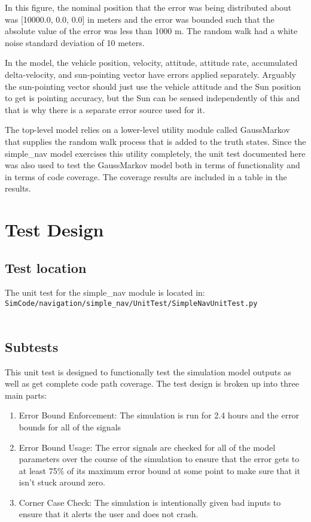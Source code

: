 \documentclass[]{BasiliskReportMemo}
\begin{document}



In this figure, the nominal position that the error was being distributed about
 was [10000.0, 0.0, 0.0] in meters and the error was bounded such that the 
absolute value of the error was less than 1000 m.  The random walk had a white 
noise standard deviation of 10 meters.

In the model, the vehicle position, velocity, attitude, attitude rate, 
accumulated delta-velocity, and sun-pointing vector have errors applied 
separately.  Arguably the sun-pointing vector should just use the vehicle 
attitude and the Sun position to get is pointing accuracy, but the Sun can be 
sensed independently of this and that is why there is a separate error source
used for it.

The top-level model relies on a lower-level utility module called GaussMarkov 
that supplies the random walk process that is added to the truth states.  
Since the simple\_nav model exercises this utility completely, the unit test 
documented here was also used to test the GaussMarkov model both in terms of 
functionality and in terms of code coverage.  The coverage results are included 
in a table in the results.

\section{Test Design}

\subsection{Test location}

The unit test for the simple\_nav module is located in:\\

\noindent
{\tt SimCode/navigation/simple\_nav/UnitTest/SimpleNavUnitTest.py} \\
\\

\subsection{Subtests}

\noindent This unit test is designed to functionally test the simulation model 
outputs as well as get complete code path coverage.  The test design is broken 
up into three main parts:\\
\begin{enumerate}
\item{Error Bound Enforcement: The simulation is run for 2.4 hours and the 
   error bounds for all of the signals }
\item{Error Bound Usage: The error signals are checked for all of the model 
   parameters over the course of the simulation to ensure that the error gets 
   to at least 75\% of its maximum error bound at some point to make sure that 
   it isn't stuck around zero.}
\item{Corner Case Check: The simulation is intentionally given bad inputs to 
   ensure that it alerts the user and does not crash.}
\end{enumerate}
\end{document}
